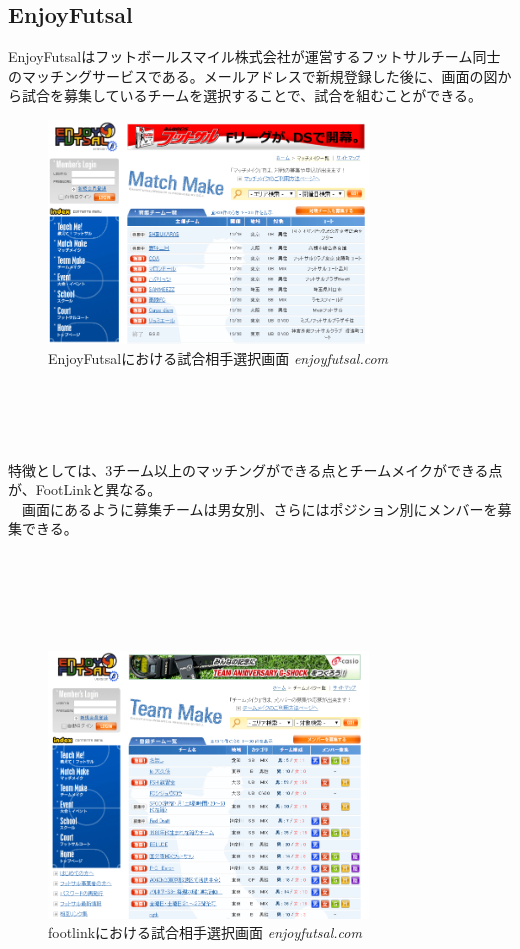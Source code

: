 \subsection{EnjoyFutsal}
EnjoyFutsalはフットボールスマイル株式会社が運営するフットサルチーム同士のマッチングサービスである。メールアドレスで新規登録した後に、画面の図から試合を募集しているチームを選択することで、試合を組むことができる。
\begin{figure}[htbp]
	\centering
	\includegraphics[width=85mm, bb=0 0 800 272]{figures/ef.jpg}
	\caption{EnjoyFutsalにおける試合相手選択画面 {\itshape enjoyfutsal.com}}
	\label{EnjoyFutsalにおける試合相手選択画面}
\end{figure}
\\
\\
\\
\\
特徴としては、3チーム以上のマッチングができる点とチームメイクができる点が、FootLinkと異なる。
\\　画面にあるように募集チームは男女別、さらにはポジション別にメンバーを募集できる。
\\
\\
\\
\\
\\
\\
\begin{figure}[htbp]
	\centering
	\includegraphics[width=85mm, bb=0 0 800 272]{figures/mm.jpg}
	\caption{footlinkにおける試合相手選択画面 {\itshape enjoyfutsal.com}}
	\label{EnjoyFutsalにおける部員募集画面}
\end{figure}
